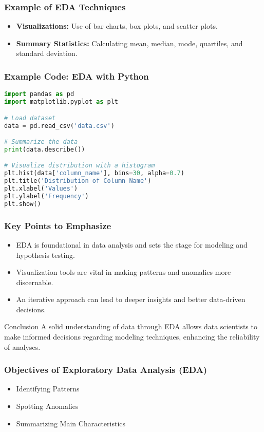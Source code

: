 \documentclass{beamer}
\begin{document}
\begin{frame}[fragile]
    \frametitle{Example of EDA Techniques}
    \begin{itemize}
        \item \textbf{Visualizations:} Use of 
        bar charts, box plots, and scatter plots.
        \item \textbf{Summary Statistics:} Calculating mean, median, mode, quartiles, and standard deviation.
    \end{itemize}
\end{frame}

\begin{frame}[fragile]
    \frametitle{Example Code: EDA with Python}
    \begin{lstlisting}[language=Python]
import pandas as pd
import matplotlib.pyplot as plt

# Load dataset
data = pd.read_csv('data.csv')

# Summarize the data
print(data.describe())

# Visualize distribution with a histogram
plt.hist(data['column_name'], bins=30, alpha=0.7)
plt.title('Distribution of Column Name')
plt.xlabel('Values')
plt.ylabel('Frequency')
plt.show()
    \end{lstlisting}
\end{frame}

\begin{frame}[fragile]
    \frametitle{Key Points to Emphasize}
    \begin{itemize}
        \item EDA is foundational in data analysis and sets the stage for modeling and hypothesis testing.
        \item Visualization tools are vital in making patterns and anomalies more discernable.
        \item An iterative approach can lead to deeper insights and better data-driven decisions.
    \end{itemize}
    \begin{block}{Conclusion}
        A solid understanding of data through EDA allows data scientists to make informed decisions regarding modeling techniques, enhancing the reliability of analyses.
    \end{block}
\end{frame}

\begin{frame}[fragile]
    \frametitle{Objectives of Exploratory Data Analysis (EDA)}
    \begin{itemize}
        \item Identifying Patterns
        \item Spotting Anomalies
        \item Summarizing Main Characteristics
    \end{itemize}
\end{frame}
\end{document}
